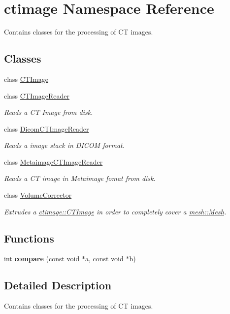 \hypertarget{namespacectimage}{
\section{ctimage Namespace Reference}
\label{namespacectimage}
}


Contains classes for the processing of CT images.  


\subsection*{Classes}
\begin{DoxyCompactItemize}
\item 
class \hyperlink{classctimage_1_1_c_t_image}{CTImage}
\item 
class \hyperlink{classctimage_1_1_c_t_image_reader}{CTImageReader}
\begin{DoxyCompactList}\small\item\em Reads a CT Image from disk. \item\end{DoxyCompactList}\item 
class \hyperlink{classctimage_1_1_dicom_c_t_image_reader}{DicomCTImageReader}
\begin{DoxyCompactList}\small\item\em Reads a image stack in DICOM format. \item\end{DoxyCompactList}\item 
class \hyperlink{classctimage_1_1_metaimage_c_t_image_reader}{MetaimageCTImageReader}
\begin{DoxyCompactList}\small\item\em Reads a CT image in Metaimage fomat from disk. \item\end{DoxyCompactList}\item 
class \hyperlink{classctimage_1_1_volume_corrector}{VolumeCorrector}
\begin{DoxyCompactList}\small\item\em Extrudes a \hyperlink{classctimage_1_1_c_t_image}{ctimage::CTImage} in order to completely cover a \hyperlink{classmesh_1_1_mesh}{mesh::Mesh}. \item\end{DoxyCompactList}\end{DoxyCompactItemize}
\subsection*{Functions}
\begin{DoxyCompactItemize}
\item 
\hypertarget{namespacectimage_a73795e2058eb46885bb3c932cc6a2bdb}{
int {\bfseries compare} (const void $\ast$a, const void $\ast$b)}
\label{namespacectimage_a73795e2058eb46885bb3c932cc6a2bdb}

\end{DoxyCompactItemize}


\subsection{Detailed Description}
Contains classes for the processing of CT images. 